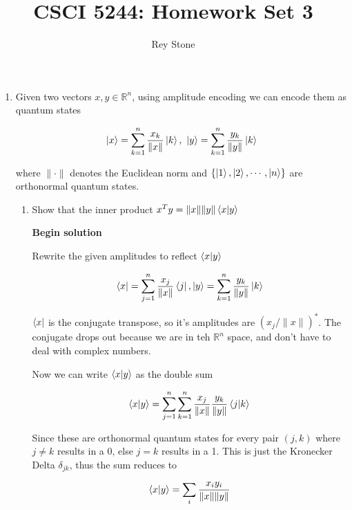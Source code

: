 \documentclass[11pt]{article}
\title{CSCI 5244: Homework Set 3}
\date{}
\author{Rey Stone}
\begin{document}
\maketitle

\raggedright
\begin{enumerate}
	\item Given two vectors $x,y \in \mathbb{R}^n$, using amplitude encoding we can encode them as quantum states

	      \begin{equation*}
		      \ket{x} = \sum_{k=1}^n \frac{x_k}{\|x\|} \ket{k}, \ \ket{y} = \sum_{k=1}^n \frac{y_k}{\|y\|} \ket{k}
	      \end{equation*}

	      where $\| \cdot \|$ denotes the Euclidean norm and $\{\ket{1}, \ket{2}, \cdots, \ket{n}\}$ are orthonormal quantum states.

	      \begin{enumerate}
		      \item Show that the inner product $x^{T}y = \|x\| \|y\| \braket{x|y}$

		            \textbf{Begin solution}

		            Rewrite the given amplitudes to reflect $\braket{x|y}$

		            \begin{equation*}
			            \bra{x} = \sum_{j=1}^n \frac{x_j}{\|x\|} \bra{j}, \ket{y} = \sum_{k=1}^n \frac{y_k}{\|y\|} \ket{k}
		            \end{equation*}

		            $\bra{x}$ is the conjugate transpose, so it's amplitudes are $(x_j/\|x\|)^*$. The conjugate drops out because we are in teh $\mathbb{R}^n$ space, and don't have to deal with complex numbers.

		            Now we can write $\braket{x|y}$ as the double sum

		            \begin{equation*}
			            \braket{x|y} = \sum_{j=1}^n \sum_{k=1}^n \frac{x_j}{\|x\|} \frac{y_k}{\|y\|} \braket{j|k}
		            \end{equation*}

		            Since these are orthonormal quantum states for every pair $(j,k)$ where $j \ne k$ results in a 0, else $j = k$ results in a 1. This is just the Kronecker Delta $\delta_{jk}$, thus the sum reduces to

		            \begin{equation*}
			            \braket{x|y} = \sum_i\frac{x_i y_i}{\|x\| \|y\|}
		            \end{equation*}


\end{enumerate}
\end{enumerate}
\end{document}
